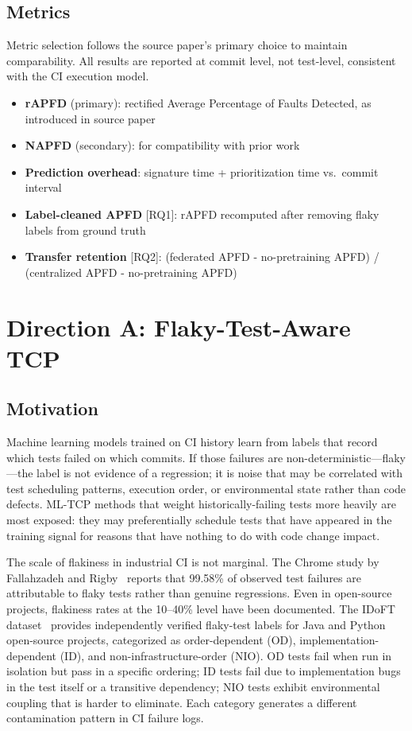\documentclass[10pt,conference]{IEEEtran}
\begin{document}
\subsection{Metrics}

Metric selection follows the source paper's primary choice to maintain comparability. All results are reported at commit level, not test-level, consistent with the CI execution model.

\begin{itemize}[leftmargin=*]
\item \textbf{rAPFD} (primary): rectified Average Percentage of Faults Detected, as introduced in source paper
\item \textbf{NAPFD} (secondary): for compatibility with prior work
\item \textbf{Prediction overhead}: signature time + prioritization time vs.\ commit interval
\item \textbf{Label-cleaned APFD} [RQ1]: rAPFD recomputed after removing flaky labels from ground truth
\item \textbf{Transfer retention} [RQ2]: (federated APFD - no-pretraining APFD) / (centralized APFD - no-pretraining APFD)
\end{itemize}

\section{Direction A: Flaky-Test-Aware TCP}\label{sec:direction_a}

\subsection{Motivation}

Machine learning models trained on CI history learn from labels that record which tests failed on which commits. If those failures are non-deterministic---flaky---the label is not evidence of a regression; it is noise that may be correlated with test scheduling patterns, execution order, or environmental state rather than code defects. ML-TCP methods that weight historically-failing tests more heavily are most exposed: they may preferentially schedule tests that have appeared in the training signal for reasons that have nothing to do with code change impact.

The scale of flakiness in industrial CI is not marginal. The Chrome study by Fallahzadeh and Rigby~\cite{chromeflakystudy} reports that 99.58\% of observed test failures are attributable to flaky tests rather than genuine regressions. Even in open-source projects, flakiness rates at the 10--40\% level have been documented. The IDoFT dataset~\cite{idoft} provides independently verified flaky-test labels for Java and Python open-source projects, categorized as order-dependent (OD), implementation-dependent (ID), and non-infrastructure-order (NIO). OD tests fail when run in isolation but pass in a specific ordering; ID tests fail due to implementation bugs in the test itself or a transitive dependency; NIO tests exhibit environmental coupling that is harder to eliminate. Each category generates a different contamination pattern in CI failure logs.
\end{document}
